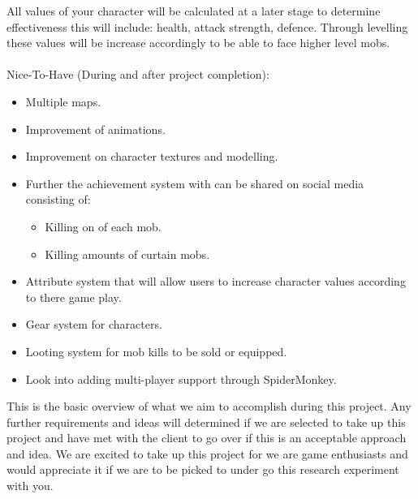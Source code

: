 \documentclass[letterpaper]{article}
\begin{document}
			All values of your character will be calculated at a later stage to determine effectiveness this will include: health, attack strength, defence. Through levelling these values will be increase accordingly to be able to face higher level mobs.
			\\
			\\
			Nice-To-Have (During and after project completion): \\
			\begin{itemize}
				\item Multiple maps.
				\item Improvement of animations.
				\item Improvement on character textures and modelling.
				\item Further the achievement system with can be shared on social media consisting of:
					\begin{itemize}
						\item Killing on of each mob.
						\item Killing amounts of curtain mobs.
					\end{itemize}
				\item Attribute system that will allow users to increase character values according to there game play.
				\item Gear system for characters.
				\item Looting system for mob kills to be sold or equipped.
				\item Look into adding multi-player support through SpiderMonkey.
			\end{itemize}
			
			\vspace{0.1in}
			\noindent This is the basic overview of what we aim to accomplish during this project. Any further requirements and ideas will determined if we are selected to take up this project and have met with the client to go over if this is an acceptable approach and idea. We are excited to take up this project for we are game enthusiasts and would appreciate it if we are to be picked to under go this research experiment with you.
		
		\vspace{0.2in}
		
		\section*{\colorbox{blue}{}} 
		
\end{document}
